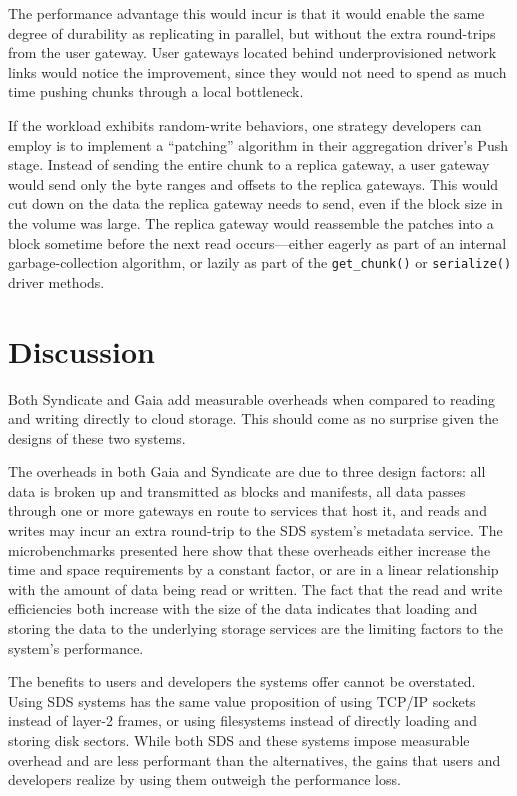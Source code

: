 The performance advantage this would incur is that it would enable the same
degree of durability as replicating in parallel, but without the extra
round-trips from the user gateway.  User gateways located behind
underprovisioned network links would notice the improvement, since they would
not need to spend as much time pushing chunks through a local bottleneck.

\hfill \break
{}
\hfill \break

If the workload exhibits random-write behaviors, one strategy developers can
employ is to implement a ``patching'' algorithm in their aggregation driver's
Push stage.  Instead of sending the entire chunk to a replica gateway, a user
gateway would send only the byte ranges and offsets to the replica gateways.
This would cut down on the data the replica gateway needs to send, even if the
block size in the volume was large.
The replica gateway would reassemble the patches into a block sometime before
the next read occurs---either eagerly as part of an internal
garbage-collection algorithm, or lazily as part of the \texttt{get\_chunk()} or
\texttt{serialize()} driver methods.

\section{Discussion}

Both Syndicate and Gaia add measurable overheads when compared to reading and
writing directly to cloud storage.  This should come as no surprise given the
designs of these two systems.

The overheads in both Gaia and Syndicate are due to three design factors:
all data is broken up and transmitted as blocks and manifests, all data
passes through one or more gateways en route to services that host it, and reads
and writes may incur an extra round-trip to the SDS system's metadata service.
The microbenchmarks presented here show that these overheads either increase the
time and space requirements by a constant factor, or are in a linear
relationship with the amount of data being read or written.  The fact that
the read and write efficiencies both increase with the size of the data indicates
that loading and storing the data to the underlying storage services are the
limiting factors to the system's performance.

The benefits to users and developers the systems offer cannot be overstated.
Using SDS systems has the same value proposition of using TCP/IP sockets instead of
layer-2 frames, or using filesystems instead of directly loading and storing
disk sectors.  While both SDS and these systems impose measurable overhead
and are less performant than the alternatives, the gains that users and
developers realize by using them outweigh the performance loss.

